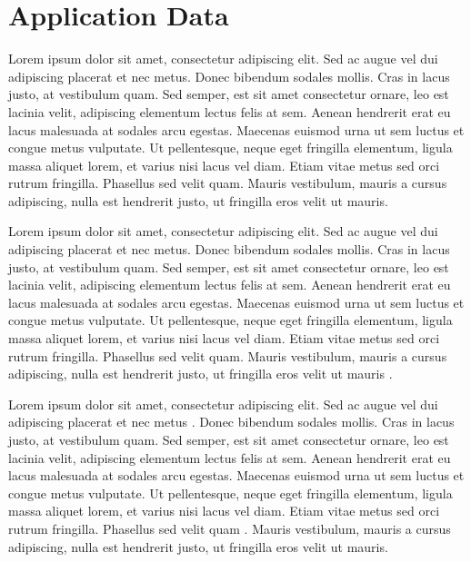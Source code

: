 \section{Application Data}

Lorem ipsum dolor sit amet, consectetur adipiscing elit. Sed ac augue vel dui 
adipiscing placerat et nec metus. Donec bibendum sodales mollis. Cras in lacus 
justo, at vestibulum quam. Sed semper, est sit amet consectetur ornare, leo est 
lacinia velit, adipiscing elementum lectus felis at sem. Aenean hendrerit erat eu 
lacus malesuada at sodales arcu egestas. Maecenas euismod urna ut sem luctus et 
congue metus vulputate. Ut pellentesque, neque eget fringilla elementum, ligula 
massa aliquet lorem, et varius nisi lacus vel diam. Etiam vitae metus sed orci 
rutrum fringilla. Phasellus sed velit quam. Mauris vestibulum, mauris a cursus 
adipiscing, nulla est hendrerit justo, ut fringilla eros velit ut mauris.

Lorem ipsum dolor sit amet, consectetur adipiscing elit. Sed ac augue vel dui 
adipiscing placerat et nec metus. Donec bibendum sodales mollis. Cras in lacus 
justo, at vestibulum quam. Sed semper, est sit amet consectetur ornare, leo est 
lacinia velit, adipiscing elementum lectus felis at sem. Aenean hendrerit erat eu 
lacus malesuada at sodales arcu egestas. Maecenas euismod urna ut sem luctus et 
congue metus vulputate. Ut pellentesque, neque eget fringilla elementum, ligula 
massa aliquet lorem, et varius nisi lacus vel diam. Etiam vitae metus sed orci 
rutrum fringilla. Phasellus sed velit quam. Mauris vestibulum, mauris a cursus 
adipiscing, nulla est hendrerit justo, ut fringilla eros velit ut mauris
\cite{Wegener2000629}.


Lorem ipsum dolor sit amet, consectetur adipiscing elit. Sed ac augue vel dui 
adipiscing placerat et nec metus \cite{Wolchik2000843}. 
Donec bibendum sodales mollis. Cras in lacus 
justo, at vestibulum quam. Sed semper, est sit amet consectetur ornare, leo est 
lacinia velit, adipiscing elementum lectus felis at sem. Aenean hendrerit erat eu 
lacus malesuada at sodales arcu egestas. Maecenas euismod urna ut sem luctus et 
congue metus vulputate. Ut pellentesque, neque eget fringilla elementum, ligula 
massa aliquet lorem, et varius nisi lacus vel diam. Etiam vitae metus sed orci 
rutrum fringilla. Phasellus sed velit quam \cite{Zuckerman199486}. 
Mauris vestibulum, mauris a cursus 
adipiscing, nulla est hendrerit justo, ut fringilla eros velit ut mauris.

